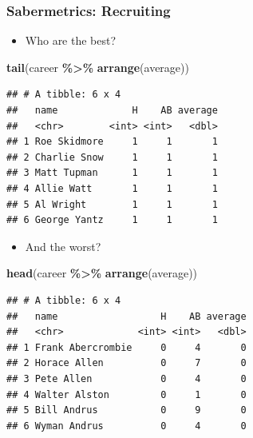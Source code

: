 \documentclass[
  shownotes,
  xcolor={svgnames},
  hyperref={colorlinks,citecolor=DarkBlue,linkcolor=DarkRed,urlcolor=DarkBlue}
  ]{beamer}
\newenvironment{Shaded}{\begin{snugshade}}{\end{snugshade}}
\newcommand{\KeywordTok}[1]{\textcolor[rgb]{0.13,0.29,0.53}{\textbf{#1}}}
\newcommand{\NormalTok}[1]{#1}
\newcommand{\OperatorTok}[1]{\textcolor[rgb]{0.81,0.36,0.00}{\textbf{#1}}}
\newcommand{\StringTok}[1]{\textcolor[rgb]{0.31,0.60,0.02}{#1}}
\begin{document}
\begin{frame}[fragile]
\frametitle{Sabermetrics: Recruiting}
\begin{itemize}
  \item Who are the best?
\end{itemize} 
\tiny
\begin{Shaded}
\begin{Highlighting}[]
\KeywordTok{tail}\NormalTok{(career }\OperatorTok{\%\textgreater{}\%}\StringTok{ }\KeywordTok{arrange}\NormalTok{(average))}
\end{Highlighting}
\end{Shaded}

\begin{verbatim}
## # A tibble: 6 x 4
##   name             H    AB average
##   <chr>        <int> <int>   <dbl>
## 1 Roe Skidmore     1     1       1
## 2 Charlie Snow     1     1       1
## 3 Matt Tupman      1     1       1
## 4 Allie Watt       1     1       1
## 5 Al Wright        1     1       1
## 6 George Yantz     1     1       1
\end{verbatim}


\begin{itemize}
  \item And the worst?
\end{itemize}
\tiny
\begin{Shaded}
\begin{Highlighting}[]
\KeywordTok{head}\NormalTok{(career }\OperatorTok{\%\textgreater{}\%}\StringTok{ }\KeywordTok{arrange}\NormalTok{(average))}
\end{Highlighting}
\end{Shaded}

\begin{verbatim}
## # A tibble: 6 x 4
##   name                  H    AB average
##   <chr>             <int> <int>   <dbl>
## 1 Frank Abercrombie     0     4       0
## 2 Horace Allen          0     7       0
## 3 Pete Allen            0     4       0
## 4 Walter Alston         0     1       0
## 5 Bill Andrus           0     9       0
## 6 Wyman Andrus          0     4       0
\end{verbatim}

\end{frame}
\end{document}
